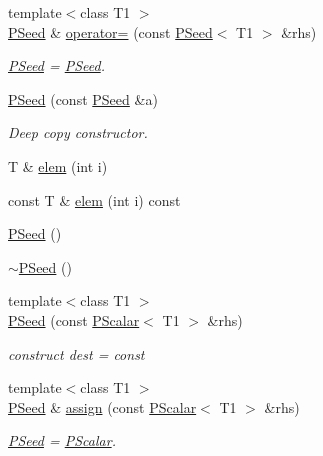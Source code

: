 \begin{DoxyCompactItemize}
{\footnotesize template$<$class T1 $>$ }\\\mbox{\hyperlink{classENSEM_1_1PSeed}{P\+Seed}} \& \mbox{\hyperlink{classENSEM_1_1PSeed_a22c88645227bfddbfea703ed71117795}{operator=}} (const \mbox{\hyperlink{classENSEM_1_1PSeed}{P\+Seed}}$<$ T1 $>$ \&rhs)
\begin{DoxyCompactList}\small\item\em \mbox{\hyperlink{classENSEM_1_1PSeed}{P\+Seed}} = \mbox{\hyperlink{classENSEM_1_1PSeed}{P\+Seed}}. \end{DoxyCompactList}\item 
\mbox{\hyperlink{classENSEM_1_1PSeed_a3a38a0e42c0c2ed2996eff03e32eebdc}{P\+Seed}} (const \mbox{\hyperlink{classENSEM_1_1PSeed}{P\+Seed}} \&a)
\begin{DoxyCompactList}\small\item\em Deep copy constructor. \end{DoxyCompactList}\item 
T \& \mbox{\hyperlink{classENSEM_1_1PSeed_aeed16139a22df65e16fd064b7808c49a}{elem}} (int i)
\item 
const T \& \mbox{\hyperlink{classENSEM_1_1PSeed_aa9151226aec3137be3417bbf36f770aa}{elem}} (int i) const
\item 
\mbox{\hyperlink{classENSEM_1_1PSeed_a23818769d84caba2047eaf425f2073f1}{P\+Seed}} ()
\item 
\mbox{\hyperlink{classENSEM_1_1PSeed_a6796252e24ea4c2ec43bf2600f2ffdc7}{$\sim$\+P\+Seed}} ()
\item 
{\footnotesize template$<$class T1 $>$ }\\\mbox{\hyperlink{classENSEM_1_1PSeed_a0c2df1585f47479069319dd97de9c4ea}{P\+Seed}} (const \mbox{\hyperlink{classENSEM_1_1PScalar}{P\+Scalar}}$<$ T1 $>$ \&rhs)
\begin{DoxyCompactList}\small\item\em construct dest = const \end{DoxyCompactList}\item 
{\footnotesize template$<$class T1 $>$ }\\\mbox{\hyperlink{classENSEM_1_1PSeed}{P\+Seed}} \& \mbox{\hyperlink{classENSEM_1_1PSeed_a8d74bd21af23dfb165937c3bb546ea8f}{assign}} (const \mbox{\hyperlink{classENSEM_1_1PScalar}{P\+Scalar}}$<$ T1 $>$ \&rhs)
\begin{DoxyCompactList}\small\item\em \mbox{\hyperlink{classENSEM_1_1PSeed}{P\+Seed}} = \mbox{\hyperlink{classENSEM_1_1PScalar}{P\+Scalar}}. \end{DoxyCompactList}\item 

\end{DoxyCompactItemize}
